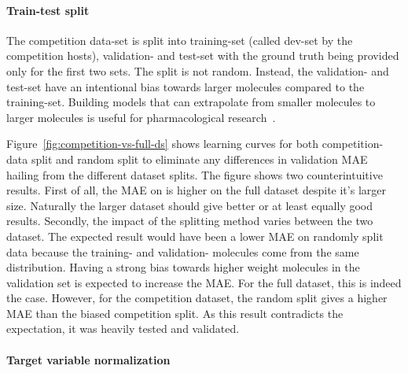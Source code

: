 \paragraph{Train-test split}
The competition data-set is split into training-set (called dev-set by the competition hosts), validation- and test-set with the ground truth being provided only for the first two sets. The split is not random. Instead, the validation- and test-set have an intentional bias towards larger molecules compared to the training-set. Building models that can extrapolate from smaller molecules to larger molecules is useful for pharmacological research~\cite{Chen2019}.

Figure~\ref{fig:competition-vs-full-ds} shows learning curves for both competition-data split and random split to eliminate any differences in validation MAE hailing from the different dataset splits.
The figure shows two counterintuitive results. First of all, the MAE on is higher on the full dataset despite it's larger size. Naturally the larger dataset should give better or at least equally good results. Secondly, the impact of the splitting method varies between the two dataset. The expected result would have been a lower MAE on randomly split data because the training- and validation- molecules come from the same distribution. Having a strong bias towards higher weight molecules in the validation set is expected to increase the MAE. For the full dataset, this is indeed the case. However, for the competition dataset, the random split gives a higher MAE than the biased competition split. As this result contradicts the expectation, it was heavily tested and validated.



\paragraph{Target variable normalization}


